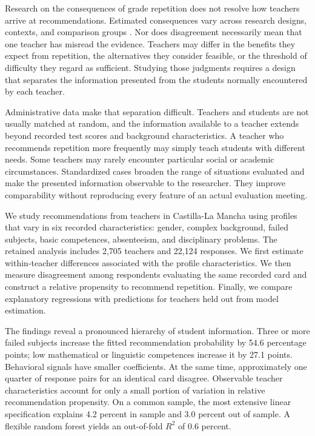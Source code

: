 Research on the consequences of grade repetition does not resolve how teachers arrive at recommendations. Estimated consequences vary across research designs, contexts, and comparison groups \cite{allen,goos}. Nor does disagreement necessarily mean that one teacher has misread the evidence. Teachers may differ in the benefits they expect from repetition, the alternatives they consider feasible, or the threshold of difficulty they regard as sufficient. Studying those judgments requires a design that separates the information presented from the students normally encountered by each teacher.

Administrative data make that separation difficult. Teachers and students are not usually matched at random, and the information available to a teacher extends beyond recorded test scores and background characteristics. A teacher who recommends repetition more frequently may simply teach students with different needs. Some teachers may rarely encounter particular social or academic circumstances. Standardized cases broaden the range of situations evaluated and make the presented information observable to the researcher. They improve comparability without reproducing every feature of an actual evaluation meeting.

We study recommendations from teachers in Castilla-La Mancha using profiles that vary in six recorded characteristics: gender, complex background, failed subjects, basic competences, absenteeism, and disciplinary problems. The retained analysis includes 2,705 teachers and 22,124 responses. We first estimate within-teacher differences associated with the profile characteristics. We then measure disagreement among respondents evaluating the same recorded card and construct a relative propensity to recommend repetition. Finally, we compare explanatory regressions with predictions for teachers held out from model estimation.

The findings reveal a pronounced hierarchy of student information. Three or more failed subjects increase the fitted recommendation probability by 54.6 percentage points; low mathematical or linguistic competences increase it by 27.1 points. Behavioral signals have smaller coefficients. At the same time, approximately one quarter of response pairs for an identical card disagree. Observable teacher characteristics account for only a small portion of variation in relative recommendation propensity. On a common sample, the most extensive linear specification explains 4.2 percent in sample and 3.0 percent out of sample. A flexible random forest yields an out-of-fold $R^2$ of 0.6 percent.

